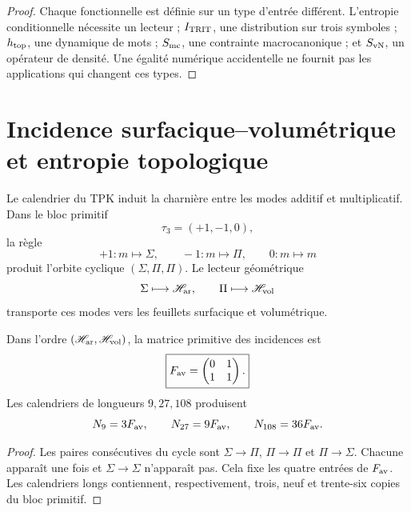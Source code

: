 \begin{proof}
Chaque fonctionnelle est définie sur un type d'entrée différent. L'entropie
conditionnelle nécessite un lecteur ; \(I_{\rm TRIT}\), une distribution sur trois
symboles ; \(h_{\rm top}\), une dynamique de mots ; \(S_{\rm mc}\), une
contrainte macrocanonique ; et \(S_{\rm vN}\), un opérateur de densité. Une
égalité numérique accidentelle ne fournit pas les applications qui changent ces types.
\end{proof}

\section{Incidence surfacique--volumétrique et entropie topologique}

Le calendrier du TPK induit la charnière entre les modes additif et
multiplicatif. Dans le bloc primitif
\[
 \tau_3=(+1,-1,0),
\]
la règle
\[
 +1:m\mapsto\Sigma,
 \qquad
 -1:m\mapsto\Pi,
 \qquad
 0:m\mapsto m
\]
produit l’orbite cyclique \((\Sigma,\Pi,\Pi)\). Le lecteur géométrique
\[
 \Sigma\longmapsto\mathscr H_{\rm ar},
 \qquad
 \Pi\longmapsto\mathscr H_{\rm vol}
\]
transporte ces modes vers les feuillets surfacique et volumétrique.

\begin{theorem}
\label{thm:incidencia-hojas-anexo}
Dans l’ordre \((\mathscr H_{\rm ar},\mathscr H_{\rm vol})\), la matrice
primitive des incidences est
\begin{equation}
 \boxed{
 F_{\rm av}=
 \begin{pmatrix}0&1\\1&1\end{pmatrix}.}
 \label{eq:fav-anexo-informacion}
\end{equation}
Les calendriers de longueurs \(9,27,108\) produisent
\[
 N_9=3F_{\rm av},
 \qquad N_{27}=9F_{\rm av},
 \qquad N_{108}=36F_{\rm av}.
\]
\end{theorem}

\begin{proof}
Les paires consécutives du cycle sont
\(\Sigma\to\Pi\), \(\Pi\to\Pi\) et \(\Pi\to\Sigma\). Chacune apparaît une
fois et \(\Sigma\to\Sigma\) n’apparaît pas. Cela fixe les quatre entrées de
\(F_{\rm av}\). Les calendriers longs contiennent, respectivement, trois,
neuf et trente-six copies du bloc primitif.
\end{proof}

